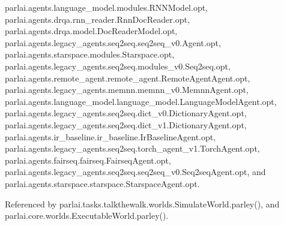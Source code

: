 parlai.\+agents.\+language\+\_\+model.\+modules.\+R\+N\+N\+Model.\+opt, parlai.\+agents.\+drqa.\+rnn\+\_\+reader.\+Rnn\+Doc\+Reader.\+opt, parlai.\+agents.\+drqa.\+model.\+Doc\+Reader\+Model.\+opt, parlai.\+agents.\+legacy\+\_\+agents.\+seq2seq.\+seq2seq\+\_\+v0.\+Agent.\+opt, parlai.\+agents.\+starspace.\+modules.\+Starspace.\+opt, parlai.\+agents.\+legacy\+\_\+agents.\+seq2seq.\+modules\+\_\+v0.\+Seq2seq.\+opt, parlai.\+agents.\+remote\+\_\+agent.\+remote\+\_\+agent.\+Remote\+Agent\+Agent.\+opt, parlai.\+agents.\+legacy\+\_\+agents.\+memnn.\+memnn\+\_\+v0.\+Memnn\+Agent.\+opt, parlai.\+agents.\+language\+\_\+model.\+language\+\_\+model.\+Language\+Model\+Agent.\+opt, parlai.\+agents.\+legacy\+\_\+agents.\+seq2seq.\+dict\+\_\+v0.\+Dictionary\+Agent.\+opt, parlai.\+agents.\+legacy\+\_\+agents.\+seq2seq.\+dict\+\_\+v1.\+Dictionary\+Agent.\+opt, parlai.\+agents.\+ir\+\_\+baseline.\+ir\+\_\+baseline.\+Ir\+Baseline\+Agent.\+opt, parlai.\+agents.\+legacy\+\_\+agents.\+seq2seq.\+torch\+\_\+agent\+\_\+v1.\+Torch\+Agent.\+opt, parlai.\+agents.\+fairseq.\+fairseq.\+Fairseq\+Agent.\+opt, parlai.\+agents.\+legacy\+\_\+agents.\+seq2seq.\+seq2seq\+\_\+v0.\+Seq2seq\+Agent.\+opt, and parlai.\+agents.\+starspace.\+starspace.\+Starspace\+Agent.\+opt.



Referenced by parlai.\+tasks.\+talkthewalk.\+worlds.\+Simulate\+World.\+parley(), and parlai.\+core.\+worlds.\+Executable\+World.\+parley().

